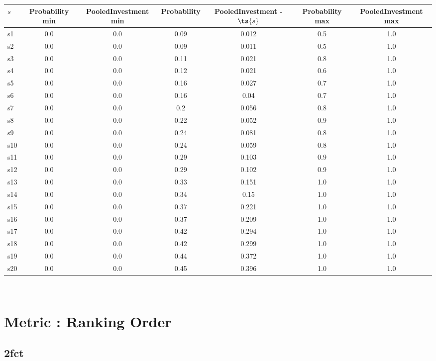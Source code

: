\documentclass{article}
\begin{document}
\noindent\begin{tabular}{|l|c|c|c|c|c|c|}
\hline
$s$& Probability min & PooledInvestment min & Probability & PooledInvestment - $\ts{s}$ & Probability max & PooledInvestment max\\
\hline
s1 &0.0 & 0.0 & 0.09 & 0.012 & 0.5 & 1.0\\
\hline
s2 &0.0 & 0.0 & 0.09 & 0.011 & 0.5 & 1.0\\
\hline
s3 &0.0 & 0.0 & 0.11 & 0.021 & 0.8 & 1.0\\
\hline
s4 &0.0 & 0.0 & 0.12 & 0.021 & 0.6 & 1.0\\
\hline
s5 &0.0 & 0.0 & 0.16 & 0.027 & 0.7 & 1.0\\
\hline
s6 &0.0 & 0.0 & 0.16 & 0.04 & 0.7 & 1.0\\
\hline
s7 &0.0 & 0.0 & 0.2 & 0.056 & 0.8 & 1.0\\
\hline
s8 &0.0 & 0.0 & 0.22 & 0.052 & 0.9 & 1.0\\
\hline
s9 &0.0 & 0.0 & 0.24 & 0.081 & 0.8 & 1.0\\
\hline
s10 &0.0 & 0.0 & 0.24 & 0.059 & 0.8 & 1.0\\
\hline
s11 &0.0 & 0.0 & 0.29 & 0.103 & 0.9 & 1.0\\
\hline
s12 &0.0 & 0.0 & 0.29 & 0.102 & 0.9 & 1.0\\
\hline
s13 &0.0 & 0.0 & 0.33 & 0.151 & 1.0 & 1.0\\
\hline
s14 &0.0 & 0.0 & 0.34 & 0.15 & 1.0 & 1.0\\
\hline
s15 &0.0 & 0.0 & 0.37 & 0.221 & 1.0 & 1.0\\
\hline
s16 &0.0 & 0.0 & 0.37 & 0.209 & 1.0 & 1.0\\
\hline
s17 &0.0 & 0.0 & 0.42 & 0.294 & 1.0 & 1.0\\
\hline
s18 &0.0 & 0.0 & 0.42 & 0.299 & 1.0 & 1.0\\
\hline
s19 &0.0 & 0.0 & 0.44 & 0.372 & 1.0 & 1.0\\
\hline
s20 &0.0 & 0.0 & 0.45 & 0.396 & 1.0 & 1.0\\
\hline
\end{tabular}\\

\newpage
\section{Metric : Ranking Order}

\newpage

\subsection{2fct}
\end{document}
